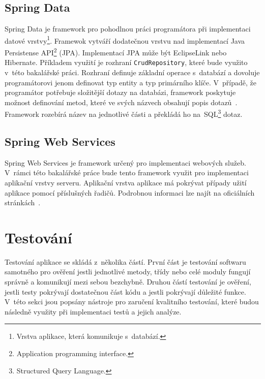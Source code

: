     \subsection{Spring Data}
        Spring Data je framework pro pohodlnou práci programátora při implementaci datové vrstvy\footnote{Vrstva aplikace, která komunikuje s~databází.}. Framewok vytváří dodatečnou vrstvu nad implementací Java Persistense API\footnote{Application programming interface.} (JPA). Implementací JPA může být EclipseLink nebo Hibernate. Příkladem využití je rozhraní \texttt{CrudRepository}, které bude využito v~této bakalářské práci. Rozhraní definuje základní operace s~databází a dovoluje programátorovi jenom definovat typ entity a typ primárního klíče. V~případě, že programátor potřebuje složitější dotazy na databázi, framework poskytuje možnost definování metod, které ve svých názvech obsahují popis dotazů~\cite{query-methods}. Framework rozebírá název na jednotlivé části a překládá ho na~SQL\footnote{Structured Query Language.} dotaz.
    
    \subsection{Spring Web Services}
        Spring Web Services je framework určený pro implementaci webových služeb. V~rámci této bakalářské práce bude tento framework využit pro implementaci aplikační vrstvy serveru. Aplikační vrstva aplikace má pokrývat případy užití aplikace pomocí příslušných řadičů. Podrobnou informaci lze najít na oficiálních stránkách~\cite{spring-web-services}.
        

    
\section{Testování}\label{reserse:testovani}
    Testování aplikace se skládá z~několika částí. První část je testování softwaru samotného pro ověření jestli jednotlivé metody, třídy nebo celé moduly fungují správně a komunikují mezi sebou bezchybně. Druhou částí testování je ověření, jestli testy pokrývají dostatečnou část kódu a jestli pokrývají důležité funkce. V~této sekci jsou popsány nástroje pro zaručení kvalitního testování, které budou následně využity při implementaci testů a jejich analýze.
    
